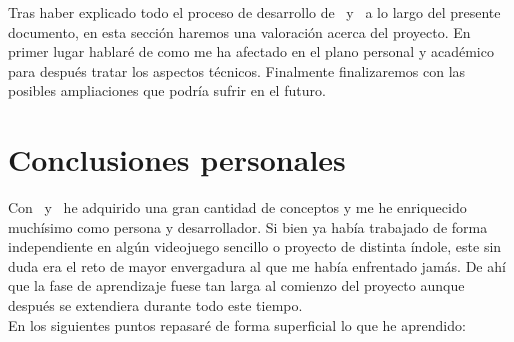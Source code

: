 Tras haber explicado todo el proceso de desarrollo de \wiki\ y \juego\
a lo largo del presente documento, en esta sección haremos una valoración
acerca del proyecto. En primer lugar hablaré de como me ha afectado en el plano
personal y académico para después tratar los aspectos técnicos. Finalmente
finalizaremos con las posibles ampliaciones que podría sufrir en el futuro.\\

\section{Conclusiones personales}

Con \wiki\ y \juego\ he adquirido una gran cantidad de conceptos y me he
enriquecido muchísimo como persona y desarrollador. Si bien ya había
trabajado de forma independiente en algún videojuego sencillo o proyecto
de distinta índole, este sin duda era el reto de mayor envergadura al que
me había enfrentado jamás. De ahí que la fase de aprendizaje fuese tan
larga al comienzo del proyecto aunque después se extendiera durante
todo este tiempo.\\

En los siguientes puntos repasaré de forma superficial lo que he aprendido:

